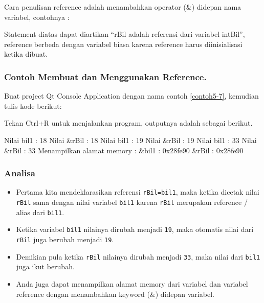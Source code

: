 Cara penulisan reference adalah menambahkan operator (\&) didepan nama
variabel, contohnya :



Statement diatas dapat diartikan ``rBil adalah referensi dari variabel
intBil'', reference berbeda dengan variabel biasa karena reference harus
diinisialisasi ketika dibuat.

\subsubsection*{Contoh Membuat dan Menggunakan Reference.}

Buat project Qt Console Application dengan nama contoh \ref{contoh5-7}, kemudian tulis
kode berikut:



Tekan Ctrl+R untuk menjalankan program, outputnya adalah sebagai
berikut.

\begin{lcverbatim}
Nilai bil1 : 18
Nilai &rBil : 18
Nilai bil1 : 19
Nilai &rBil : 19
Nilai bil1 : 33
Nilai &rBil : 33
Menampilkan alamat memory :
&bil1 : 0x28fe90
&rBil : 0x28fe90
\end{lcverbatim}

\subsubsection*{Analisa}

\begin{itemize}

\item
 Pertama kita mendeklarasikan referensi \texttt{rBil=bil1}, maka ketika
 dicetak nilai \texttt{rBil} sama dengan nilai variabel \texttt{bil1}
 karena \texttt{rBil} merupakan reference / alias dari \texttt{bil1}.
\item
 Ketika variabel \texttt{bil1} nilainya dirubah menjadi \texttt{19},
 maka otomatis nilai dari \texttt{rBil} juga berubah menjadi
 \texttt{19}.
\item
 Demikian pula ketika \texttt{rBil} nilainya dirubah menjadi
 \texttt{33}, maka nilai dari \texttt{bil1} juga ikut berubah.
\item
 Anda juga dapat menampilkan alamat memory dari variabel dan variabel
 reference dengan menambahkan keyword (\&) didepan variabel.
\end{itemize}

